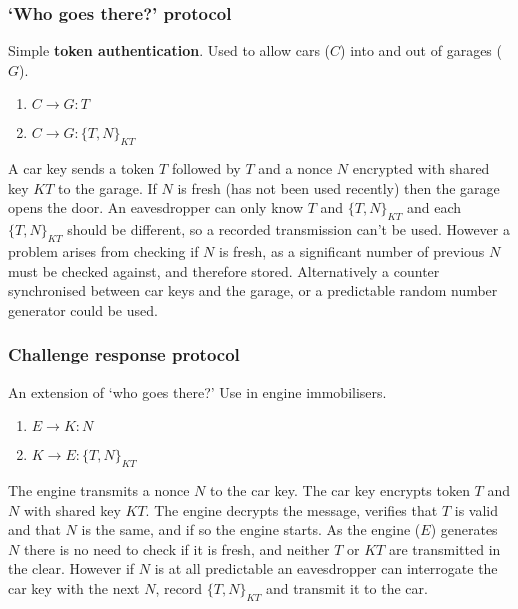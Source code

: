 \documentclass{article}
\begin{document}
\subsubsection{`Who goes there?' protocol}
Simple \textbf{token authentication}. Used to allow cars ($ C $) into and out of garages ($ G $).
\begin{enumerate}
	\item $ C \rightarrow G : T $
	\item $ C \rightarrow G : \{ T, N \}_{KT} $
\end{enumerate}
A car key sends a token $ T $ followed by $ T $ and a nonce $ N $ encrypted with shared key $ KT $ to the garage. If $ N $ is fresh (has not been used recently) then the garage opens the door. An eavesdropper can only know $ T $ and $ \{ T, N \}_{KT} $ and each $ \{ T, N \}_{KT} $ should be different, so a recorded transmission can't be used. However a problem arises from checking if $ N $ is fresh, as a significant number of previous $ N $ must be checked against, and therefore stored. Alternatively a counter synchronised between car keys and the garage, or a predictable random number generator could be used.

\subsubsection{Challenge response protocol}
An extension of `who goes there?' Use in engine immobilisers.
\begin{enumerate}
	\item $ E \rightarrow K : N $
	\item $ K \rightarrow E : \{ T, N \}_{KT} $
\end{enumerate}
The engine transmits a nonce $ N $ to the car key. The car key encrypts token $ T $ and $ N $ with shared key $ KT $. The engine decrypts the message, verifies that $ T $ is valid and that $ N $ is the same, and if so the engine starts. As the engine ($ E $) generates $ N $ there is no need to check if it is fresh, and neither $ T $ or $ KT $ are transmitted in the clear. However if $ N $ is at all predictable an eavesdropper can interrogate the car key with the next $ N $, record $ \{ T, N \}_{KT} $ and transmit it to the car.
\end{document}
